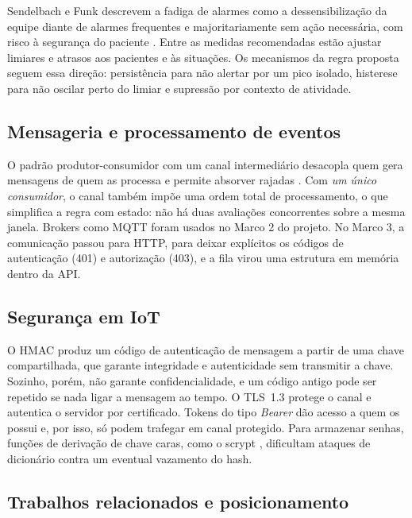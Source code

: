 \documentclass[12pt,a4paper]{article}
\begin{document}
Sendelbach e Funk descrevem a fadiga de alarmes como a dessensibilização da equipe diante de alarmes frequentes e majoritariamente sem ação necessária, com risco à segurança do paciente \cite{sendelbach2013}.
Entre as medidas recomendadas estão ajustar limiares e atrasos aos pacientes e às situações.
Os mecanismos da regra proposta seguem essa direção: persistência para não alertar por um pico isolado, histerese para não oscilar perto do limiar e supressão por contexto de atividade.

\subsection{Mensageria e processamento de eventos}

O padrão produtor-consumidor com um canal intermediário desacopla quem gera mensagens de quem as processa e permite absorver rajadas \cite{hohpe2003}.
Com \emph{um único consumidor}, o canal também impõe uma ordem total de processamento, o que simplifica a regra com estado: não há duas avaliações concorrentes sobre a mesma janela.
Brokers como MQTT foram usados no Marco 2 do projeto.
No Marco 3, a comunicação passou para HTTP, para deixar explícitos os códigos de autenticação (401) e autorização (403), e a fila virou uma estrutura em memória dentro da API.

\subsection{Segurança em IoT}

O HMAC \cite{rfc2104} produz um código de autenticação de mensagem a partir de uma chave compartilhada, que garante integridade e autenticidade sem transmitir a chave.
Sozinho, porém, não garante confidencialidade, e um código antigo pode ser repetido se nada ligar a mensagem ao tempo.
O TLS~1.3 \cite{rfc8446} protege o canal e autentica o servidor por certificado.
Tokens do tipo \emph{Bearer} \cite{rfc6750} dão acesso a quem os possui e, por isso, só podem trafegar em canal protegido.
Para armazenar senhas, funções de derivação de chave caras, como o scrypt \cite{rfc7914}, dificultam ataques de dicionário contra um eventual vazamento do hash.

\subsection{Trabalhos relacionados e posicionamento}
\end{document}
